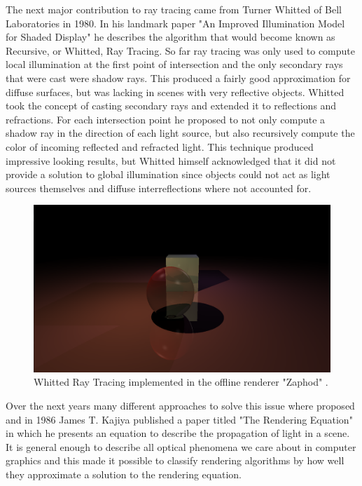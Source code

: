 \documentclass{ACGSeminar}
\begin{document}
The next major contribution to ray tracing came from Turner Whitted of Bell Laboratories in 1980. In his landmark paper "An Improved Illumination Model for Shaded Display" \cite{Whitted:1980} he describes the algorithm that would become known as Recursive, or Whitted, Ray Tracing. So far ray tracing was only used to compute local illumination at the first point of intersection and the only secondary rays that were cast were shadow rays. This produced a fairly good approximation for diffuse surfaces, but was lacking in scenes with very reflective objects. Whitted took the concept of casting secondary rays and extended it to reflections and refractions. For each intersection point he proposed to not only compute a shadow ray in the direction of each light source, but also recursively compute the color of incoming reflected and refracted light. This technique produced impressive looking results, but Whitted himself acknowledged that it did not provide a solution to global illumination since objects could not act as light sources themselves and diffuse interreflections where not accounted for.

\begin{figure}[htb!]
  \begin{centering}
    \includegraphics[width=12cm,natwidth=1280,natheight=720]{figures/whitted_raytracing.png}\par
  \end{centering}
  \caption{Whitted Ray Tracing implemented in the offline renderer "Zaphod" \cite{Zaphod}.}
  \label{fig:whitted-example}
\end{figure}


Over the next years many different approaches to solve this issue where proposed and in 1986 James T. Kajiya published a paper titled "The Rendering Equation"  \cite{Kajiya:1986} in which he presents an equation to describe the propagation of light in a scene. It is general enough to describe all optical phenomena we care about in computer graphics and this made it possible to classify rendering algorithms by how well they approximate a solution to the rendering equation.
\end{document}
